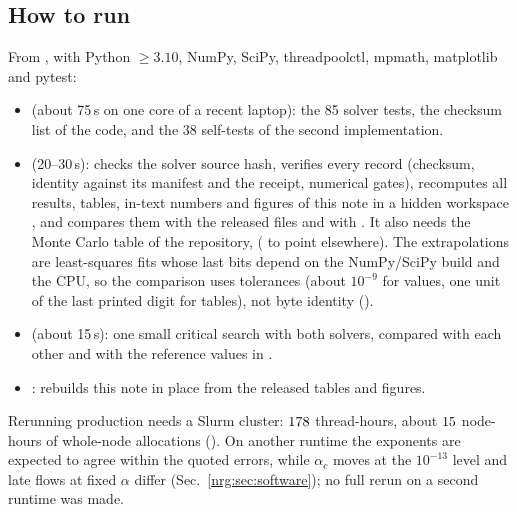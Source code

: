 \subsection{How to run}
From , with Python $\ge3.10$, NumPy, SciPy, threadpoolctl, mpmath, matplotlib and pytest:
\begin{itemize}
\item {} (about 75\,s on one core of a recent laptop): the 85 solver tests, the checksum list of the code, and the 38
  self-tests of the second implementation.
\item {} (20--30\,s): checks the solver source hash, verifies every record (checksum, identity against its manifest and
  the receipt, numerical gates), recomputes all results, tables, in-text numbers and figures of this note in a hidden workspace
  , and compares them with the released files and with . It also needs the Monte Carlo table of
  the repository,  ( to point elsewhere). The
  extrapolations are least-squares fits whose last bits depend on the NumPy/SciPy build and the CPU, so the comparison uses
  tolerances (about $10^{-9}$ for values, one unit of the last printed digit for tables), not byte identity ().
\item {} (about 15\,s): one small critical search with both solvers, compared with each other and with the
  reference values in .
\item {}: rebuilds this note in place from the released tables and figures.
\end{itemize}
Rerunning production needs a Slurm cluster: $178$ thread-hours, about $15$ node-hours of whole-node allocations
(). On another runtime the exponents are expected to agree within the quoted errors, while $\alpha_c$ moves at the
$10^{-13}$ level and late flows at fixed $\alpha$ differ (Sec.~\ref{nrg:sec:software}); no full rerun on a second runtime was made.

